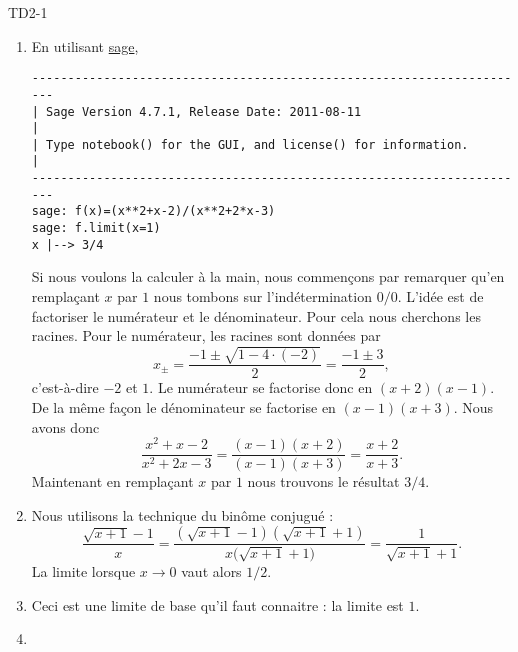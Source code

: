 
\begin{corrige}{TD2-1}

	\begin{enumerate}
		\item
            En utilisant \href{http://www.sagemath.org}{sage},
            \begin{verbatim}
----------------------------------------------------------------------
| Sage Version 4.7.1, Release Date: 2011-08-11                       |
| Type notebook() for the GUI, and license() for information.        |
----------------------------------------------------------------------
sage: f(x)=(x**2+x-2)/(x**2+2*x-3)
sage: f.limit(x=1)
x |--> 3/4
            \end{verbatim}
            Si nous voulons la calculer à la main, nous commençons par remarquer qu'en remplaçant \( x\) par \( 1\) nous tombons sur l'indétermination \( 0/0\). L'idée est de factoriser le numérateur et le dénominateur. Pour cela nous cherchons les racines. Pour le numérateur, les racines sont données par
            \begin{equation}
                x_{\pm}=\frac{ -1\pm\sqrt{1-4\cdot(-2)} }{ 2 }=\frac{ -1\pm3 }{2},
            \end{equation}
            c'est-à-dire \( -2\) et \( 1\). Le numérateur se factorise donc en \( (x+2)(x-1)\). De la même façon le dénominateur se factorise en \( (x-1)(x+3)\). Nous avons donc
            \begin{equation}
                \frac{ x^2+x-2 }{ x^2+2x-3 }=\frac{ (x-1)(x+2) }{ (x-1)(x+3) }=\frac{ x+2 }{ x+3 }.
            \end{equation}
            Maintenant en remplaçant \( x\) par \( 1\) nous trouvons le résultat \( 3/4\).
		\item
            Nous utilisons la technique du binôme conjugué :
            \begin{equation}
                \frac{ \sqrt{x+1}-1 }{ x }=\frac{ \left( \sqrt{x+1}-1 \right)\left( \sqrt{x+1}+1 \right) }{ x\big( \sqrt{x+1}+1 \big) }=\frac{ 1 }{ \sqrt{x+1}+1 }.
            \end{equation}
            La limite lorsque \( x\to 0\) vaut alors \( 1/2\).
		\item
			Ceci est une limite de base qu'il faut connaitre : la limite est $1$.
		\item

\end{enumerate}
\end{corrige}
